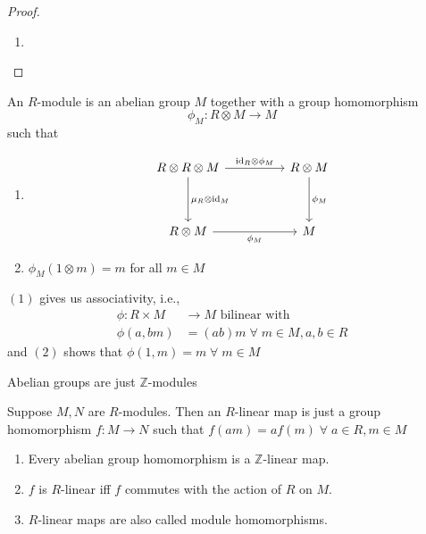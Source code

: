 \documentclass[oneside, 12pt]{scrbook}
\newcommand{\ZZ}{\mathbb Z}
\theoremstyle{theorem}
\begin{document}
\begin{proof}
\begin{enumerate}
\item 
\end{enumerate}
\end{proof}

\begin{definition}
An $R$-module is an abelian group $M$ together with a group homomorphism 
\begin{equation}
\phi_{M} : R \otimes M \longrightarrow M
\end{equation}
 such that 
 \begin{enumerate}
 \item \[\begin{tikzcd}
	{R \otimes R \otimes M} && {R\otimes M} \\
	\\
	{R\otimes M} && M
	\arrow["{\mu_{R} \otimes \mathrm{id}_{M}}", from=1-1, to=3-1]
	\arrow["{\mathrm{id}_{R}\otimes \phi_{M}}", from=1-1, to=1-3]
	\arrow["{\phi_{M}}", from=1-3, to=3-3]
	\arrow["{\phi_{M}}"', from=3-1, to=3-3]
\end{tikzcd}\]
 
 \item $\phi_{M}(1 \otimes m) = m$ for all $m \in M$
 \end{enumerate}
\end{definition}


\begin{remark}
$(1)$ gives us associativity, i.e., 
\begin{eqnarray*}
\phi: R \times M &\longrightarrow M \text{ bilinear with } \\
\phi(a, bm) &= (ab)m \; \forall \; m \in M , a,b \in R
\end{eqnarray*}
and $(2)$ shows that $\phi(1,m) = m \; \forall \; m \in M$
\end{remark}


\begin{remark}
Abelian groups are just $\ZZ$-modules
\end{remark}

Suppose $M,N$ are $R$-modules. Then an $R$-linear map is just a group homomorphism $f: M \longrightarrow N$ such that $f(am) = af(m) \; \forall \; a\in R , m \in M$

\begin{remark}
\begin{enumerate}
\item Every abelian group homomorphism is a $\ZZ$-linear map. 
\item $f$ is $R$-linear iff $f$ commutes with the action of $R$ on $M$. 
\item $R$-linear maps are also called module homomorphisms.
\end{enumerate}
\end{remark}
\end{document}
